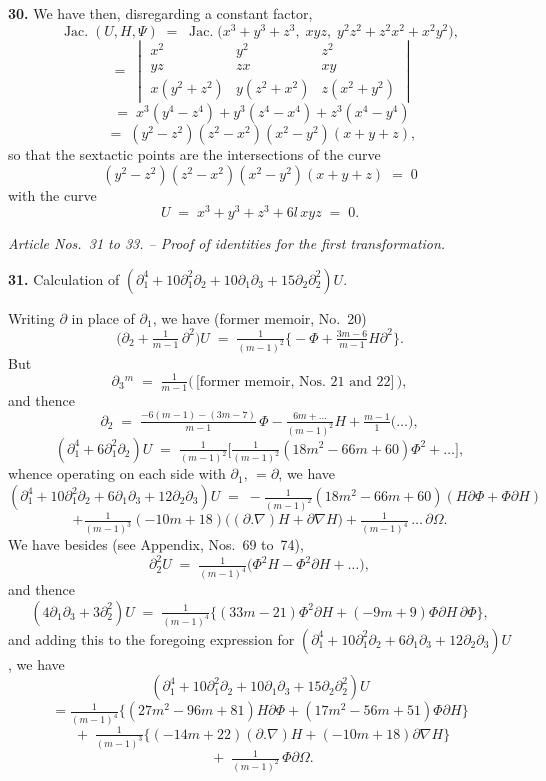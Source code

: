 \documentclass[11pt,a4paper]{article}
\providecommand{\Jac}{\operatorname{Jac.}}
\begin{document}
\medskip

\textbf{30.} We have then, disregarding a constant factor,
\[
\Jac(U,H,\Psi) \;=\; \Jac\bigl(x^3 + y^3 + z^3,\;xyz,\;y^2 z^2 + z^2 x^2 + x^2 y^2\bigr),
\]
\[
\;=\; \begin{vmatrix} x^2 & y^2 & z^2 \\[2pt] yz & zx & xy \\[2pt] x(y^2+z^2) & y(z^2+x^2) & z(x^2+y^2) \end{vmatrix}
\]
\[
\;=\; x^3(y^4 - z^4) + y^3(z^4 - x^4) + z^3(x^4 - y^4)
\]
\[
\;=\; (y^2 - z^2)(z^2 - x^2)(x^2 - y^2)(x + y + z),
\]
so that the sextactic points are the intersections of the curve
\[
(y^2 - z^2)(z^2 - x^2)(x^2 - y^2)(x+y+z) \;=\; 0
\]
with the curve
\[
U \;=\; x^3 + y^3 + z^3 + 6l\,xyz \;=\; 0.
\]

\bigskip

\begin{center}
\textit{Article Nos.\ 31 to 33. -- Proof of identities for the first transformation.}
\end{center}

\textbf{31.} Calculation of $(\partial_1^4 + 10\partial_1^2\partial_2 + 10\partial_1\partial_3 + 15\partial_2\partial_2^2)U$.

Writing $\partial$ in place of $\partial_1$, we have (former memoir, No.~20)
\[
\bigl(\partial_2 + \tfrac{1}{m-1}\,\partial^2\bigr)U \;=\; \tfrac{1}{(m-1)^2}\bigl\{-\Phi + \tfrac{3m-6}{m-1}H\partial^2\bigr\}.
\]
But
\[
\partial_3{}^m \;=\; \tfrac{1}{m-1}\bigl(\,\text{[former memoir, Nos.~21 and 22]}\,\bigr),
\]
and thence
\[
\partial_2 \;=\; \tfrac{-6(m-1)-(3m-7)}{m-1}\,\Phi - \tfrac{6m+\ldots}{(m-1)^2}H + \tfrac{m-1}{1}\bigl(\ldots\bigr),
\]
\[
(\partial_1^4 + 6\partial_1^2\partial_2)U \;=\; \tfrac{1}{(m-1)^2}\bigl[\tfrac{1}{(m-1)^2}(18m^2 - 66m + 60)\Phi^2 + \ldots \bigr],
\]
whence operating on each side with $\partial_1,\,=\partial$, we have
\[
(\partial_1^4 + 10\partial_1^2\partial_2 + 6\partial_1\partial_3 + 12\partial_2\partial_3)U \;=\; -\tfrac{1}{(m-1)^2}(18m^2 - 66m + 60)(H\partial\Phi + \Phi\partial H)
\]
\[
+ \tfrac{1}{(m-1)^3}(-10m+18)\bigl((\partial.\nabla)H + \partial\nabla H\bigr) + \tfrac{1}{(m-1)^4}\,\ldots\,\partial\Omega.
\]
We have besides (see Appendix, Nos.~69 to~74),
\[
\partial_2^2 U \;=\; \tfrac{1}{(m-1)^4}\bigl(\Phi^2 H - \Phi^2\partial H + \ldots\bigr),
\]
and thence
\[
(4\partial_1\partial_3 + 3\partial_2^2)U \;=\; \tfrac{1}{(m-1)^4}\bigl\{(33m - 21)\Phi^2 \partial H + (-9m+9)\Phi\partial H\,\partial\Phi\bigr\},
\]
and adding this to the foregoing expression for $(\partial_1^4 + 10\partial_1^2\partial_2 + 6\partial_1\partial_3 + 12\partial_2\partial_3)U$, we have
\[
(\partial_1^4 + 10\partial_1^2\partial_2 + 10\partial_1\partial_3 + 15\partial_2\partial_2^2)U
\]
\[
= \tfrac{1}{(m-1)^4}\bigl\{(27m^2 - 96m + 81)H\partial\Phi + (17m^2 - 56m + 51)\Phi\partial H\bigr\}
\]
\[
\;+\; \tfrac{1}{(m-1)^3}\bigl\{(-14m + 22)(\partial.\nabla)H + (-10m+18)\partial\nabla H\bigr\}
\]
\[
\;+\; \tfrac{1}{(m-1)^2}\,\Phi\partial\Omega.
\]
\end{document}
